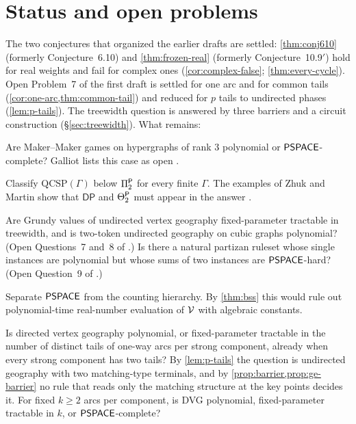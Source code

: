 \section{Status and open problems}\label{sec:open}

The two conjectures that organized the earlier drafts are settled: \cref{thm:conj610} (formerly Conjecture~6.10) and \cref{thm:frozen-real} (formerly Conjecture~10.9$'$) hold for real weights and fail for complex ones (\cref{cor:complex-false}; \cref{thm:every-cycle}). Open Problem~7 of the first draft is settled for one arc and for common tails (\cref{cor:one-arc,thm:common-tail}) and reduced for $p$ tails to undirected phases (\cref{lem:p-tails}). The treewidth question is answered by three barriers and a circuit construction (\S\ref{sec:treewidth}). What remains:

\begin{problem}\label{prob:makermaker}
Are Maker--Maker games on hypergraphs of rank $3$ polynomial or $\mathsf{PSPACE}$-complete? Galliot lists this case as open \cite{Galliot25}.
\end{problem}

\begin{problem}\label{prob:qcsp}
Classify $\mathrm{QCSP}(\Gamma)$ below $\Pi_2^{\mathsf{P}}$ for every finite $\Gamma$. The examples of Zhuk and Martin show that $\mathsf{DP}$ and $\Theta_2^{\mathsf{P}}$ must appear in the answer \cite{ZhukMartin}.
\end{problem}

\begin{problem}\label{prob:grundy}
Are Grundy values of undirected vertex geography fixed-parameter tractable in treewidth, and is two-token undirected geography on cubic graphs polynomial? (Open Questions~7 and~8 of \cite{BFT}.) Is there a natural partizan ruleset whose single instances are polynomial but whose sums of two instances are $\mathsf{PSPACE}$-hard? (Open Question~9 of \cite{BFT}.)
\end{problem}

\begin{problem}\label{prob:ch}
Separate $\mathsf{PSPACE}$ from the counting hierarchy. By \cref{thm:bss} this would rule out polynomial-time real-number evaluation of $\mathcal{V}$ with algebraic constants.
\end{problem}

\begin{problem}\label{prob:two-tails}
Is directed vertex geography polynomial, or fixed-parameter tractable in the number of distinct tails of one-way arcs per strong component, already when every strong component has two tails? By \cref{lem:p-tails} the question is undirected geography with two matching-type terminals, and by \cref{prop:barrier,prop:ge-barrier} no rule that reads only the matching structure at the key points decides it. For fixed $k\ge2$ arcs per component, is DVG polynomial, fixed-parameter tractable in $k$, or $\mathsf{PSPACE}$-complete?
\end{problem}

